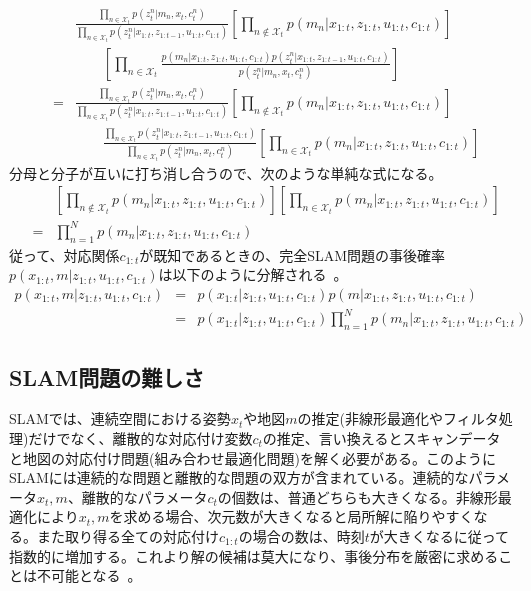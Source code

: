 \documentclass[dvipdfmx,a4paper]{jsarticle}
\begin{document}
\begin{eqnarray}
	&& \frac{\prod_{n \in \mathcal{X}_t} p(z_t^n | m_n, x_t, c_t^n)}{\prod_{n \in \mathcal{X}_t} p(z_t^n | x_{1 : t}, z_{1 : t - 1}, u_{1 : t}, c_{1 : t})} \left[ \prod_{n \notin \mathcal{X}_t} p(m_n | x_{1 : t}, z_{1 : t}, u_{1 : t}, c_{1 : t}) \right] \nonumber \\
	&& \qquad \left[ \prod_{n \in \mathcal{X}_t} \frac{p(m_n | x_{1 : t}, z_{1 : t}, u_{1 : t}, c_{1 : t}) p(z_t^n | x_{1 : t}, z_{1 : t - 1}, u_{1 : t}, c_{1 : t})}{p(z_t^n | m_n, x_t, c_t^n)} \right] \nonumber \\
	&=& \frac{\prod_{n \in \mathcal{X}_t} p(z_t^n | m_n, x_t, c_t^n)}{\prod_{n \in \mathcal{X}_t} p(z_t^n | x_{1 : t}, z_{1 : t - 1}, u_{1 : t}, c_{1 : t})} \left[ \prod_{n \notin \mathcal{X}_t} p(m_n | x_{1 : t}, z_{1 : t}, u_{1 : t}, c_{1 : t}) \right] \nonumber \\
	&& \qquad \frac{\prod_{n \in \mathcal{X}_t} p(z_t^n | x_{1 : t}, z_{1 : t - 1}, u_{1 : t}, c_{1 : t})}{\prod_{n \in \mathcal{X}_t} p(z_t^n | m_n, x_t, c_t^n)} \left[ \prod_{n \in \mathcal{X}_t} p(m_n | x_{1 : t}, z_{1 : t}, u_{1 : t}, c_{1 : t}) \right] \nonumber
\end{eqnarray}
分母と分子が互いに打ち消し合うので、次のような単純な式になる。
\begin{eqnarray}
	&& \left[ \prod_{n \notin \mathcal{X}_t} p(m_n | x_{1 : t}, z_{1 : t}, u_{1 : t}, c_{1 : t}) \right] \left[ \prod_{n \in \mathcal{X}_t} p(m_n | x_{1 : t}, z_{1 : t}, u_{1 : t}, c_{1 : t}) \right] \nonumber \\
	&=& \prod_{n = 1}^N p(m_n | x_{1 : t}, z_{1 : t}, u_{1 : t}, c_{1 : t})
\end{eqnarray}
従って、対応関係$c_{1 : t}$が既知であるときの、完全SLAM問題の事後確率$p(x_{1 : t}, m | z_{1 : t}, u_{1 : t}, c_{1 : t})$は以下のように分解される~\cite{Thrun07}\cite{Tomono16}。
\begin{eqnarray}
	p(x_{1 : t}, m | z_{1 : t}, u_{1 : t}, c_{1 : t}) &=& p(x_{1 : t} | z_{1 : t}, u_{1 : t}, c_{1 : t}) p(m | x_{1 : t}, z_{1 : t}, u_{1 : t}, c_{1 : t}) \nonumber \\
	&=& p(x_{1 : t} | z_{1 : t}, u_{1 : t}, c_{1 : t}) \prod_{n = 1}^N p(m_n | x_{1 : t}, z_{1 : t}, u_{1 : t}, c_{1 : t})
\end{eqnarray}

\subsection{SLAM問題の難しさ}
SLAMでは、連続空間における姿勢$x_t$や地図$m$の推定(非線形最適化やフィルタ処理)だけでなく、離散的な対応付け変数$c_t$の推定、言い換えるとスキャンデータと地図の対応付け問題(組み合わせ最適化問題)を解く必要がある。このようにSLAMには連続的な問題と離散的な問題の双方が含まれている。連続的なパラメータ$x_t, m$、離散的なパラメータ$c_t$の個数は、普通どちらも大きくなる。非線形最適化により$x_t, m$を求める場合、次元数が大きくなると局所解に陥りやすくなる。また取り得る全ての対応付け$c_{1 : t}$の場合の数は、時刻$t$が大きくなるに従って指数的に増加する。これより解の候補は莫大になり、事後分布を厳密に求めることは不可能となる~\cite{Thrun07}\cite{Tomono16}\cite{Tomono18}。



\end{document}
